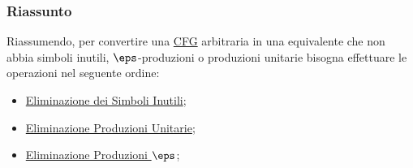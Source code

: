 \subsubsection{Riassunto}\label{sub:ll_elim_riassunto} %
Riassumendo, per convertire una \hyperref[def:cfg]{CFG} arbitraria in una equivalente che non abbia simboli inutili, $\eps$-produzioni o produzioni unitarie bisogna effettuare le operazioni nel seguente ordine:
\begin{itemize}
    \item \hyperref[sub:ll_eliminazione_dei_simboli_inutili]{Eliminazione dei Simboli Inutili};
    \item \hyperref[sub:ll_eliminazione_produzioni_unitarie]{Eliminazione Produzioni Unitarie};
    \item \hyperref[sub:ll_eliminazione_produzioni_eps]{Eliminazione Produzioni $\eps$};
\end{itemize}
%
